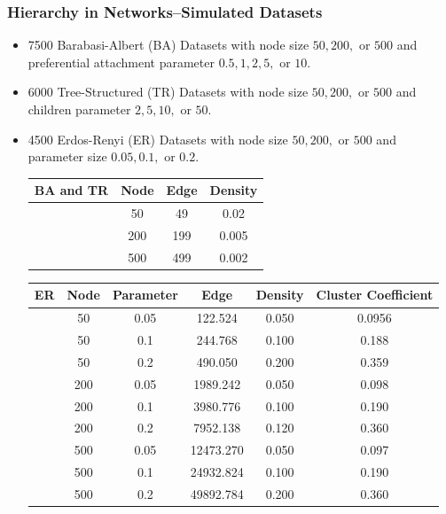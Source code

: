 \documentclass[xcolor={table}]{beamer}
\begin{document}
\begin{frame}\frametitle{Hierarchy in Networks--Simulated Datasets}
	\begin{itemize}
		\item 7500 Barabasi-Albert (BA) Datasets with node size $50, 200,$ or $500$ and preferential attachment parameter $0.5, 1, 2, 5,$ or $10$.
		\item 6000 Tree-Structured (TR) Datasets with node size $50, 200,$ or $500$ and children parameter $2, 5, 10,$ or $50$.
		\item 4500 Erdos-Renyi (ER) Datasets with node size $50, 200,$ or $500$ and parameter size $0.05, 0.1,$ or $0.2$.
		\scriptsize
			\begin{table}
				\begin{tabular}{| r || c | c | c |}
					\hline
					 BA and TR & Node & Edge & Density     \\
					\hline
					 &  50&  49&  0.02    \\	
					 &  200& 199&  0.005    \\
					 &  500& 499&  0.002    \\
					\hline
					\end{tabular}
				\end{table}
				\begin{table}
					\begin{tabular}{| r || c | c | c |c| c|}
						\hline
						ER & Node & Parameter& Edge & Density&Cluster Coefficient \\
						\hline
						& 50& 0.05&122.524 & 0.050 &  0.0956  \\
						  & 50& 0.1&244.768 & 0.100 &  0.188   \\
						  & 50& 0.2&490.050 & 0.200 &  0.359   \\	
						  &200&0.05&1989.242 &0.050&    0.098\\
						  &200&0.1&3980.776& 0.100&     0.190\\
						  &200&0.2&7952.138& 0.120&     0.360\\
						  &500&0.05&12473.270& 0.050&    0.097\\
						  &500&0.1&24932.824& 0.100&       0.190\\
						  &500&0.2&49892.784& 0.200&  0.360	\\			
						\hline
					\end{tabular}
				\end{table}
	\end{itemize}
\end{frame}
\end{document}
